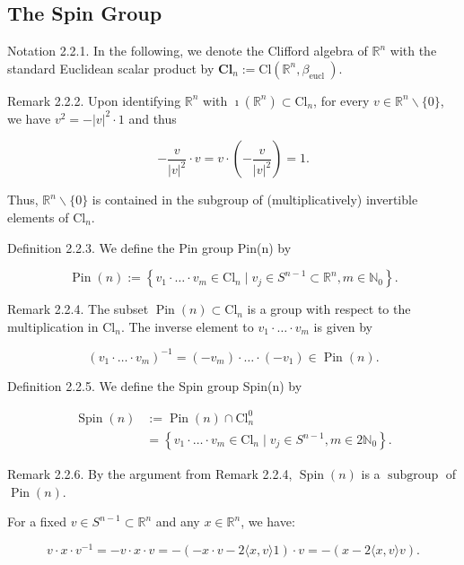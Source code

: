 \documentclass[10pt, letterpaper]{article}
\begin{document}
\pagebreak

\subsection{The Spin Group}
Notation 2.2.1. In the following, we denote the Clifford algebra of $\mathbb{R}^{n}$ with the standard Euclidean scalar product by $\mathbf{C l}_{n}:=\mathrm{Cl}\left(\mathbb{R}^{n}, \beta_{\text {eucl }}\right)$.

Remark 2.2.2. Upon identifying $\mathbb{R}^{n}$ with $\imath\left(\mathbb{R}^{n}\right) \subset \mathrm{Cl}_{n}$, for every $v \in \mathbb{R}^{n} \backslash\{0\}$, we have $v^{2}=-|v|^{2} \cdot 1$ and thus

$$
-\frac{v}{|v|^{2}} \cdot v=v \cdot\left(-\frac{v}{|v|^{2}}\right)=1 .
$$

Thus, $\mathbb{R}^{n} \backslash\{0\}$ is contained in the subgroup of (multiplicatively) invertible elements of $\mathrm{Cl}_{n}$.

Definition 2.2.3. We define the Pin group Pin(n) by

$$
\operatorname{Pin}(n):=\left\{v_{1} \cdot \ldots \cdot v_{m} \in \mathrm{Cl}_{n} \mid v_{j} \in S^{n-1} \subset \mathbb{R}^{n}, m \in \mathbb{N}_{0}\right\} .
$$

Remark 2.2.4. The subset $\operatorname{Pin}(n) \subset \mathrm{Cl}_{n}$ is a group with respect to the multiplication in $\mathrm{Cl}_{n}$. The inverse element to $v_{1} \cdot \ldots \cdot v_{m}$ is given by

$$
\left(v_{1} \cdot \ldots \cdot v_{m}\right)^{-1}=\left(-v_{m}\right) \cdot \ldots \cdot\left(-v_{1}\right) \in \operatorname{Pin}(n) .
$$

Definition 2.2.5. We define the Spin group Spin(n) by

$$
\begin{aligned}
\operatorname{Spin}(n) & :=\operatorname{Pin}(n) \cap \mathrm{Cl}_{n}^{0} \\
& =\left\{v_{1} \cdot \ldots \cdot v_{m} \in \mathrm{Cl}_{n} \mid v_{j} \in S^{n-1}, m \in 2 \mathbb{N}_{0}\right\} .
\end{aligned}
$$

Remark 2.2.6. By the argument from Remark 2.2.4, $\operatorname{Spin}(n)$ is a $\operatorname{subgroup}$ of $\operatorname{Pin}(n)$.

For a fixed $v \in S^{n-1} \subset \mathbb{R}^{n}$ and any $x \in \mathbb{R}^{n}$, we have:

$$
v \cdot x \cdot v^{-1}=-v \cdot x \cdot v=-(-x \cdot v-2\langle x, v\rangle 1) \cdot v=-(x-2\langle x, v\rangle v) .
$$
\end{document}
